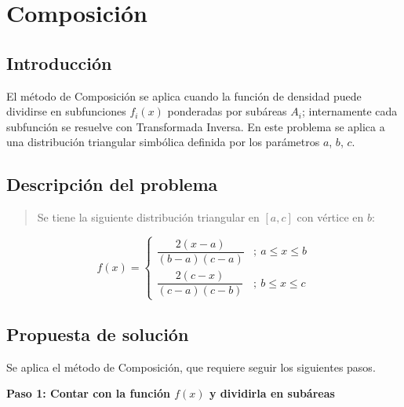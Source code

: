 \section{Composición}

\subsection{Introducción}

El método de Composición se aplica cuando la función de densidad puede dividirse en subfunciones $f_i(x)$ ponderadas por subáreas $A_i$; internamente cada subfunción se resuelve con Transformada Inversa. En este problema se aplica a una distribución triangular simbólica definida por los parámetros $a$, $b$, $c$.

\subsection{Descripción del problema}

\begin{quote}
Se tiene la siguiente distribución triangular en $[a,c]$ con vértice en $b$:
\end{quote}

\begin{center}
\shorthandoff{>}
\shorthandon{>}
\end{center}

\[
f(x)=\begin{cases}
\dfrac{2(x-a)}{(b-a)(c-a)} &;\ a \leq x \leq b \\[8pt]
\dfrac{2(c-x)}{(c-a)(c-b)} &;\ b \leq x \leq c
\end{cases}
\]

\subsection{Propuesta de solución}

Se aplica el método de Composición, que requiere seguir los siguientes pasos.

\textbf{Paso 1: Contar con la función $f(x)$ y dividirla en subáreas}

